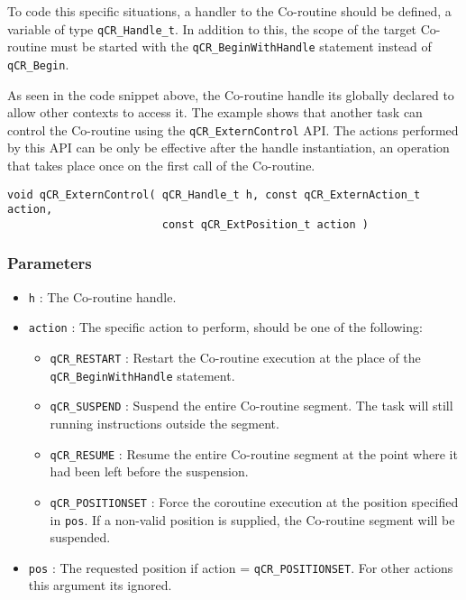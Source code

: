 To code this specific situations, a handler to the Co-routine should be defined, a variable of type \lstinline{qCR_Handle_t}. In addition to this, the scope of the target Co-routine must be started with the \lstinline{qCR_BeginWithHandle} statement instead of \lstinline{qCR_Begin}.
\medskip



As seen in the code snippet above, the Co-routine handle its globally declared to allow other contexts to access it.  The example shows that another task can control the Co-routine using the \lstinline{qCR_ExternControl} API. The actions performed by this API can be only be effective after the handle instantiation, an operation that takes place once on the first call of the Co-routine.
\medskip

\begin{lstlisting}[style=CStyle]
void qCR_ExternControl( qCR_Handle_t h, const qCR_ExternAction_t action,  
                        const qCR_ExtPosition_t action )                      
\end{lstlisting}

\subsubsection*{Parameters}
\begin{itemize}
    \item \lstinline{h} : The Co-routine handle.
    \item \lstinline{action} : The specific action to perform, should be one of the following:
    \begin{itemize}
        \item \lstinline{qCR_RESTART} : Restart the Co-routine execution at the place of the \lstinline{qCR_BeginWithHandle} statement.  
        \item \lstinline{qCR_SUSPEND} :  Suspend the entire Co-routine segment. The task will still running instructions outside the segment.
        \item \lstinline{qCR_RESUME} : Resume the entire Co-routine segment at the point where it had been left before the suspension.
        \item \lstinline{qCR_POSITIONSET} : Force the coroutine execution at the position specified in \lstinline{pos}. If a non-valid position is supplied, the Co-routine segment will be suspended.      
    \end{itemize}
    \item \lstinline{pos} : The requested position if action = \lstinline{qCR_POSITIONSET}. For other actions this argument its ignored.  
\end{itemize}

